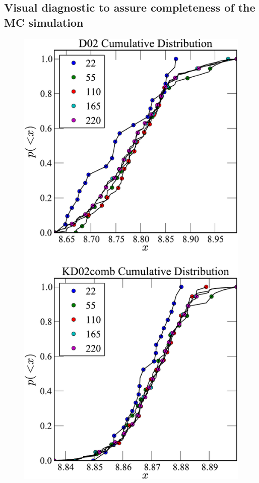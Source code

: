 \documentclass{emulateapj}
\begin{document}
\subsection{Visual diagnostic to assure completeness of the MC simulation}\label{sec:completeness}

\begin{figure}[!ht]
\centerline{
\includegraphics[width=0.65\columnwidth]{exampledata_n200_testcomplete.pdf}
}
\end{figure}
\end{document}
